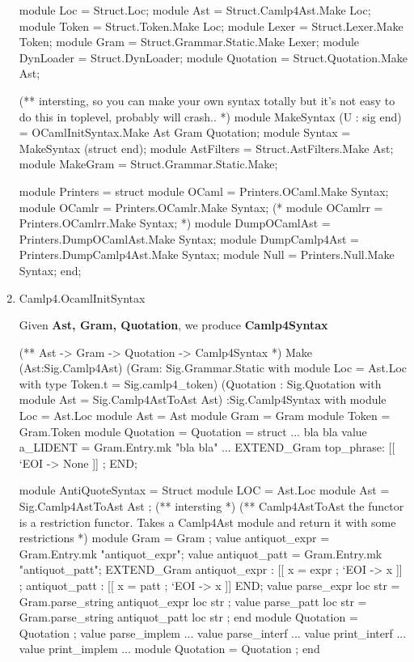 \begin{enumerate}
\begin{bluecode}
module Loc = Struct.Loc; 
module Ast = Struct.Camlp4Ast.Make Loc;
module Token = Struct.Token.Make Loc;
module Lexer = Struct.Lexer.Make Token;
module Gram = Struct.Grammar.Static.Make Lexer;
module DynLoader = Struct.DynLoader;
module Quotation = Struct.Quotation.Make Ast;

(** intersting, so you can make your own syntax totally
    but it's not easy to do this in toplevel, probably will crash..
*)
module MakeSyntax (U : sig end) = OCamlInitSyntax.Make Ast Gram Quotation;
module Syntax = MakeSyntax (struct end);
module AstFilters = Struct.AstFilters.Make Ast;
module MakeGram = Struct.Grammar.Static.Make;

module Printers = struct
  module OCaml = Printers.OCaml.Make Syntax;
  module OCamlr = Printers.OCamlr.Make Syntax;
  (* module OCamlrr = Printers.OCamlrr.Make Syntax; *)
  module DumpOCamlAst = Printers.DumpOCamlAst.Make Syntax;
  module DumpCamlp4Ast = Printers.DumpCamlp4Ast.Make Syntax;
  module Null = Printers.Null.Make Syntax;
end;

\end{bluecode}



\item Camlp4.OcamlInitSyntax
  
  Given \textbf{Ast, Gram, Quotation}, we produce \textbf{Camlp4Syntax}

\begin{bluecode}
(** Ast -> Gram -> Quotation -> Camlp4Syntax *)
Make (Ast:Sig.Camlp4Ast) (Gram:  Sig.Grammar.Static
  with  module Loc = Ast.Loc 
  with type Token.t = Sig.camlp4_token)
  (Quotation : Sig.Quotation
  with module Ast = Sig.Camlp4AstToAst Ast) :Sig.Camlp4Syntax
  with module Loc = Ast.Loc
       module Ast = Ast
       module Gram = Gram
       module Token = Gram.Token
       module Quotation = Quotation
= struct
   ... bla bla
 value a_LIDENT = Gram.Entry.mk "bla bla"
  ...
 EXTEND_Gram
  top_phrase:
    [[ `EOI -> None ]]
  ;
 END;

 module AntiQuoteSyntax = Struct
  module LOC = Ast.Loc
  module Ast = Sig.Camlp4AstToAst Ast ; (** intersting *)
  (** Camlp4AstToAst the functor is a restriction
      functor. Takes a Camlp4Ast module and return it with some
      restrictions
   *)
  module Gram = Gram ;
  value antiquot_expr = Gram.Entry.mk "antiquot_expr";
  value antiquot_patt = Gram.Entry.mk "antiquot_patt";
  EXTEND_Gram
    antiquot_expr :
      [[ x = expr ; `EOI -> x ]] ;
    antiquot_patt :
      [[ x = patt ; `EOI -> x  ]]
  END;
  value parse_expr loc str = Gram.parse_string antiquot_expr loc str ;
  value parse_patt loc str = Gram.parse_string antiquot_patt loc str ;
 end
 module Quotation = Quotation ; 
 value parse_implem ...
 value parse_interf ...
 value print_interf ...
 value print_implem ...
 module Quotation = Quotation ; 
end 
\end{bluecode}



\end{enumerate}
